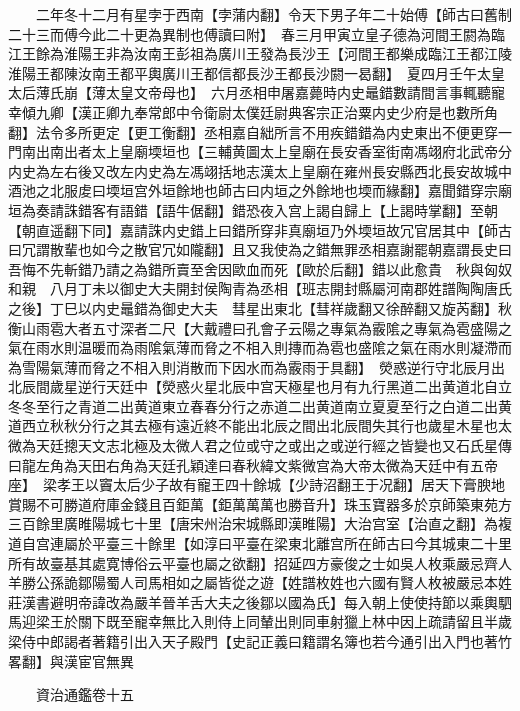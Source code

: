 　　二年冬十二月有星孛于西南【孛蒲内翻】令天下男子年二十始傅【師古曰舊制二十三而傅今此二十更為異制也傅讀曰附】　春三月甲寅立皇子德為河間王閼為臨江王餘為淮陽王非為汝南王彭祖為廣川王發為長沙王【河間王都樂成臨江王都江陵淮陽王都陳汝南王都平輿廣川王都信都長沙王都長沙閼一曷翻】　夏四月壬午太皇太后薄氏崩【薄太皇文帝母也】　六月丞相申屠嘉薨時内史鼂錯數請間言事輒聽寵幸傾九卿【漢正卿九奉常郎中令衛尉太僕廷尉典客宗正治粟内史少府是也數所角翻】法令多所更定【更工衡翻】丞相嘉自絀所言不用疾錯錯為内史東出不便更穿一門南出南出者太上皇廟堧垣也【三輔黄圖太上皇廟在長安香室街南馮翊府北武帝分内史為左右後又改左内史為左馮翊括地志漢太上皇廟在雍州長安縣西北長安故城中酒池之北服䖍曰堧垣宫外垣餘地也師古曰内垣之外餘地也堧而緣翻】嘉聞錯穿宗廟垣為奏請誅錯客有語錯【語牛倨翻】錯恐夜入宫上謁自歸上【上謁時掌翻】至朝【朝直遥翻下同】嘉請誅内史錯上曰錯所穿非真廟垣乃外堧垣故冗官居其中【師古曰冗謂散輩也如今之散官冗如隴翻】且又我使為之錯無罪丞相嘉謝罷朝嘉謂長史曰吾悔不先斬錯乃請之為錯所賣至舍因歐血而死【歐於后翻】錯以此愈貴　秋與匈奴和親　八月丁未以御史大夫開封侯陶青為丞相【班志開封縣屬河南郡姓譜陶陶唐氏之後】丁巳以内史鼂錯為御史大夫　彗星出東北【彗祥歲翻又徐醉翻又旋芮翻】秋衡山雨雹大者五寸深者二尺【大戴禮曰孔會子云陽之專氣為霰隂之專氣為雹盛陽之氣在雨水則温暖而為雨隂氣薄而脅之不相入則摶而為雹也盛隂之氣在雨水則凝滯而為雪陽氣薄而脅之不相入則消散而下因水而為霰雨于具翻】　熒惑逆行守北辰月出北辰間歲星逆行天廷中【熒惑火星北辰中宫天極星也月有九行黑道二出黄道北自立冬冬至行之青道二出黄道東立春春分行之赤道二出黄道南立夏夏至行之白道二出黄道西立秋秋分行之其去極有遠近終不能出北辰之間出北辰間失其行也歲星木星也太微為天廷摠天文志北極及太微人君之位或守之或出之或逆行經之皆變也又石氏星傳曰龍左角為天田右角為天廷孔穎達曰春秋緯文紫微宫為大帝太微為天廷中有五帝座】　梁孝王以竇太后少子故有寵王四十餘城【少詩沼翻王于况翻】居天下膏腴地賞賜不可勝道府庫金錢且百鉅萬【鉅萬萬萬也勝音升】珠玉寶器多於京師築東苑方三百餘里廣睢陽城七十里【唐宋州治宋城縣即漢睢陽】大治宫室【治直之翻】為複道自宫連屬於平臺三十餘里【如淳曰平臺在梁東北離宫所在師古曰今其城東二十里所有故臺基其處寛博俗云平臺也屬之欲翻】招延四方豪俊之士如吳人枚乘嚴忌齊人羊勝公孫詭鄒陽蜀人司馬相如之屬皆從之遊【姓譜枚姓也六國有賢人枚被嚴忌本姓莊漢書避明帝諱改為嚴羊晉羊舌大夫之後鄒以國為氏】每入朝上使使持節以乘輿駟馬迎梁王於關下既至寵幸無比入則侍上同輦出則同車射獵上林中因上疏請留且半歲梁侍中郎謁者著籍引出入天子殿門【史記正義曰籍謂名簿也若今通引出入門也著竹畧翻】與漢宦官無異

　　資治通鑑卷十五  
    


 


